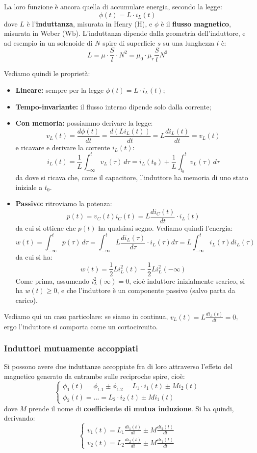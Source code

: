 \documentclass[a4paper,11pt]{article}
\begin{document}
La loro funzione è ancora quella di accumulare energia, secondo la legge:
$$
\phi(t) = L \cdot i_L (t)
$$
dove $L$ è l'\textbf{induttanza}, misurata in Henry ($\mathrm{H}$), e $\phi$ è il \textbf{flusso magnetico}, misurata in Weber ($\mathrm{Wb}$).
L'induttanza dipende dalla geometria dell'induttore, e ad esempio in un solenoide di $N$ spire di superficie $s$ su una lunghezza $l$ è:
$$ 
L = \mu \cdot \frac{S}{l} \cdot N^2 = \mu_0 \cdot \mu_r \frac{S}{l} N^2
$$

Vediamo quindi le proprietà:
\begin{itemize}
	\item \textbf{Lineare:} sempre per la legge $\phi(t) = L \cdot i_L (t)$;
	\item \textbf{Tempo-invariante:} il flusso interno dipende solo dalla corrente;
	\item \textbf{Con memoria:} possiammo derivare la legge:
		$$ 
			v_L (t) = \frac{d \phi(t)}{dt} = \frac{d (L i_L(t))}{dt} = L\frac{d i_L(t)}{dt} = v_L(t)
		$$
		e ricavare e derivare la corrente $i_L(t)$:
		$$
		i_L(t) = \frac{1}{L} \int_{-\infty}^t v_L (\tau) \, d\tau = i_L(t_0) + \frac{1}{L} \int_{t_0}^{t} v_L(\tau) \, d\tau
		$$
		da dove si ricava che, come il capacitore, l'induttore ha memoria di uno stato iniziale a $t_0$.
	\item \textbf{Passivo:} ritroviamo la potenza:
		$$
			p(t) = v_C(t) i_C(t) = L \frac{d i_C(t)}{dt} \cdot i_L(t)
		$$
		da cui si ottiene che $p(t)$ ha qualsiasi segno. Vediamo quindi l'energia:
		$$
		w(t) = \int_{-\infty}^{t} p(\tau) \, d \tau = \int_{-\infty}^{t} L \frac{d i_L(\tau)}{d\tau} \cdot i_L(\tau) d\tau = L \int_{-\infty}^t i_L(\tau) d i_L(\tau)
		$$
		da cui si ha:
		$$
		w(t) = \frac{1}{2} L i_L^2(t) - \frac{1}{2} L i_L^2 (-\infty)
		$$
		Come prima, assumendo $i_L^2(\infty) = 0$, cioè induttore inizialmente scarico, si ha $w(t) \geq 0$, e che l'induttore è un componente passivo (salvo parta da carico).
\end{itemize}

Vediamo qui un caso particolare: se siamo in continua, $v_L (t) = L \frac{d i_L(t)}{dt} = 0$, ergo l'induttore si comporta come un cortocircuito.

\subsubsection{Induttori mutuamente accoppiati}
Si possono avere due induttanze accoppiate fra di loro attraverso l'effeto del magnetico generato da entrambe sulle reciproche spire, cioè:
\[
	\begin{cases}
			
  \phi_1(t) = \phi_{1.1} \pm \phi_{1.2} = L_1 \cdot i_1 (t) \pm M i_2 (t) \\
  \phi_2(t) = ...  = L_2 \cdot i_2 (t) \pm M i_1 (t) 
	\end{cases}
\]
dove $M$ prende il nome di \textbf{coefficiente di mutua induzione}.
Si ha quindi, derivando:
\[
	\begin{cases}
		v_1(t) = L_1 \frac{d i_1(t)}{dt} \pm M \frac{d i_2(t)}{dt} \\ 
		v_2(t) = L_2 \frac{d i_2(t)}{dt} \pm M \frac{d i_1(t)}{dt}
	\end{cases}
\]
\end{document}
